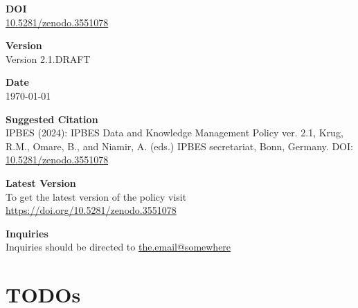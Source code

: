 \documentclass{article}
\begin{document}
\begin{center}
    \vspace{1.5em}
    
    {\LARGE \textbf{DOI}} \\[0.5em]
    \href{https://doi.org/10.5281/zenodo.3551078}{10.5281/zenodo.3551078}
    
    \vspace{1.5em}
    
    {\LARGE \textbf{Version}} \\[0.5em]
    Version 2.1.DRAFT
    
    \vspace{1.5em}
    
    {\LARGE \textbf{Date}} \\[0.5em]
    \today
    
    \vspace{1.5em}
    
    {\LARGE \textbf{Suggested Citation}} \\[0.5em]
    IPBES (2024): IPBES Data and Knowledge Management Policy ver. 2.1, Krug, R.M., Omare, B., and Niamir, A. (eds.) IPBES secretariat, Bonn, Germany. DOI: \href{https://doi.org/10.5281/zenodo.3551078}{10.5281/zenodo.3551078}
    
    \vspace{1.5em}
    
    {\LARGE \textbf{Latest Version}} \\[0.5em]
    To get the latest version of the policy visit \href{https://doi.org/10.5281/zenodo.3551078}{https://doi.org/10.5281/zenodo.3551078}
    
    \vspace{1.5em}
    
    {\LARGE \textbf{Inquiries}} \\[0.5em]
    Inquiries should be directed to \href{mailto:the.email@somewhere}{the.email@somewhere}

\end{center}

\newpage

\listoftodos

\tableofcontents

\newpage


\section{TODOs}
\end{document}
